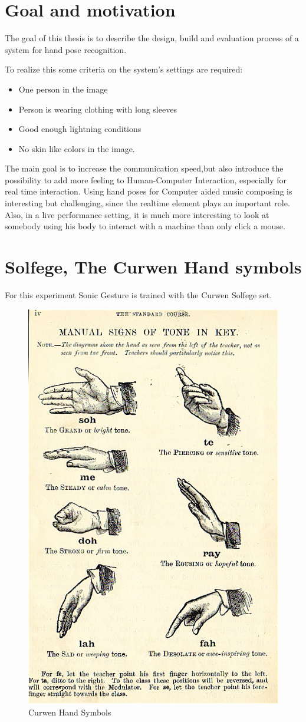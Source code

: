\section{Goal and motivation}
The goal of this thesis is to describe the design, build and evaluation process of a system for hand pose recognition.

To realize this some criteria on the system's settings are required:
\begin{itemize}
	\item One person in the image
	\item Person is wearing clothing with long sleeves
	\item Good enough lightning conditions
	\item No skin like colors in the image.
\end{itemize}

The main goal is to increase the communication speed,but also introduce the possibility to add more feeling to Human-Computer Interaction, especially for real time interaction. Using hand poses for Computer aided music composing is interesting but challenging, since the realtime element plays an important role. Also, in a live performance setting, it is much more interesting to look at somebody using his body to interact with a machine than only click a mouse.


\section{Solfege, The Curwen Hand symbols}

For this experiment Sonic Gesture is trained with the Curwen Solfege set\cite{choksy1999}.


\begin{figure}[h]

	\label{fig:curwen}
	\includegraphics[width=0.3\linewidth]{figures/curwen.jpg}
	\caption{Curwen Hand Symbols}
\end{figure}


